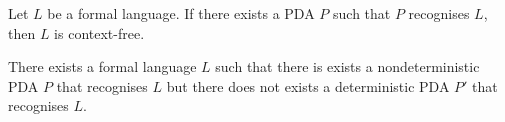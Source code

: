 \begin{theorem}[]
    Let $L$ be a formal language.
    If there exists a PDA $P$ 
    such that $P$ recognises $L$,
    then $L$ is context-free.
\end{theorem}

\begin{theorem}[]
    There exists a formal language $L$
    such that there is exists a nondeterministic PDA $P$ 
    that recognises $L$
    but there does not exists a deterministic PDA $P'$
    that recognises $L$.
\end{theorem}
